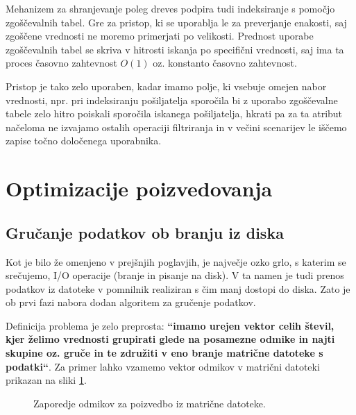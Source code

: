 \documentclass[a4paper,12pt,openright]{book}
\begin{document}
        Mehanizem za shranjevanje poleg dreves podpira tudi indeksiranje s pomočjo zgoščevalnih tabel. Gre za pristop, ki se uporablja le za preverjanje enakosti, saj zgoščene vrednosti ne moremo primerjati po velikosti.
        Prednost uporabe zgoščevalnih tabel se skriva v hitrosti iskanja po specifični vrednosti, saj ima ta proces časovno zahtevnost $O(1)$ oz. konstanto časovno zahtevnost.
        
        Pristop je tako zelo uporaben, kadar imamo polje, ki vsebuje omejen nabor vrednosti, npr. pri indeksiranju pošiljatelja sporočila bi z uporabo zgoščevalne tabele zelo hitro poiskali sporočila iskanega pošiljatelja, hkrati pa za ta atribut načeloma ne izvajamo ostalih operaciji filtriranja in v večini scenarijev le iščemo zapise točno določenega uporabnika.

    \section{Optimizacije poizvedovanja}
        
        \subsection{Gručanje podatkov ob branju iz diska}
        
        Kot je bilo že omenjeno v prejšnjih poglavjih, je največje ozko grlo, s katerim se srečujemo, I/O operacije (branje in pisanje na disk). V ta namen je tudi prenos podatkov iz datoteke v pomnilnik realiziran s čim manj dostopi do diska. Zato je ob prvi fazi nabora dodan algoritem za gručenje podatkov.

        Definicija problema je zelo preprosta: \textbf{``imamo urejen vektor celih števil, kjer želimo vrednosti grupirati glede na posamezne odmike in najti skupine oz. gruče in te združiti v eno branje matrične datoteke s podatki``}. Za primer lahko vzamemo vektor odmikov v matrični datoteki prikazan na sliki \ref{clustering_no_color}.

\hfill \break
\begin{figure}[h]
\begin{center}
\caption{Zaporedje odmikov za poizvedbo iz matrične datoteke.}
\label{clustering_no_color}
\end{center}
\end{figure}
\end{document}
